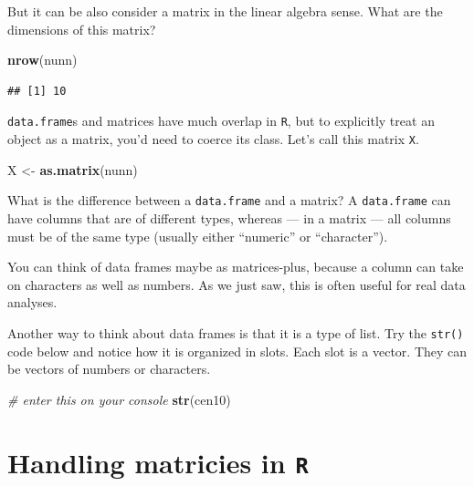 \documentclass[]{book}
\newenvironment{Shaded}{\begin{snugshade}}{\end{snugshade}}
\newcommand{\CommentTok}[1]{\textcolor[rgb]{0.56,0.35,0.01}{\textit{#1}}}
\newcommand{\KeywordTok}[1]{\textcolor[rgb]{0.13,0.29,0.53}{\textbf{#1}}}
\newcommand{\NormalTok}[1]{#1}
\newcommand{\StringTok}[1]{\textcolor[rgb]{0.31,0.60,0.02}{#1}}
\theoremstyle{definition}
\theoremstyle{definition}
\theoremstyle{definition}
\theoremstyle{remark}
\begin{document}
But it can be also consider a matrix in the linear algebra sense. What are the dimensions of this matrix?

\begin{Shaded}
\begin{Highlighting}[]
\KeywordTok{nrow}\NormalTok{(nunn)}
\end{Highlighting}
\end{Shaded}

\begin{verbatim}
## [1] 10
\end{verbatim}

\texttt{data.frame}s and matrices have much overlap in \texttt{R}, but to explicitly treat an object as a matrix, you'd need to coerce its class. Let's call this matrix \texttt{X}.

\begin{Shaded}
\begin{Highlighting}[]
\NormalTok{X <{-}}\StringTok{ }\KeywordTok{as.matrix}\NormalTok{(nunn)}
\end{Highlighting}
\end{Shaded}

What is the difference between a \texttt{data.frame} and a matrix? A \texttt{data.frame} can have columns that are of different types, whereas --- in a matrix --- all columns must be of the same type (usually either ``numeric'' or ``character'').

You can think of data frames maybe as matrices-plus, because a column can take on characters as well as numbers. As we just saw, this is often useful for real data analyses.

Another way to think about data frames is that it is a type of list. Try the \texttt{str()} code below and notice how it is organized in slots. Each slot is a vector. They can be vectors of numbers or characters.

\begin{Shaded}
\begin{Highlighting}[]
\CommentTok{\# enter this on your console}
\KeywordTok{str}\NormalTok{(cen10)}
\end{Highlighting}
\end{Shaded}

\hypertarget{handling-matricies-in-r}{%
\section{\texorpdfstring{Handling matricies in \texttt{R}}{Handling matricies in R}}\label{handling-matricies-in-r}}
\end{document}
